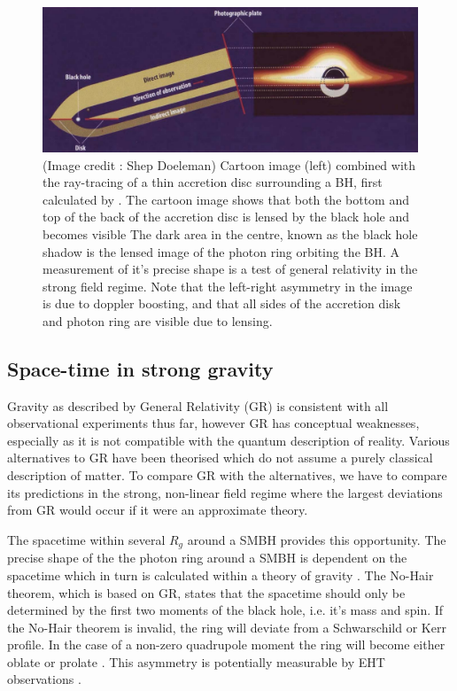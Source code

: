 \begin{figure}
\begin{center}
\includegraphics[width=\columnwidth]{Images/lensed_cartoon}
\caption{(Image credit : Shep Doeleman) Cartoon image (left) combined with the ray-tracing of a thin accretion disc surrounding a BH, first calculated by \citet{Luminet_1979}. The cartoon image shows that both the bottom and top of the back of the accretion disc is lensed by the black hole and becomes visible The dark area in the centre, known as the black hole shadow is the lensed image of the photon ring orbiting the BH. A measurement of it's precise shape is a test of general relativity in the strong field regime. Note that the left-right asymmetry in the image is due to doppler boosting, and that all sides of the accretion disk and photon ring are visible due to lensing. \label{fig:grmhd}%
}
\end{center}

\end{figure}



\subsection{Space-time in strong gravity}

Gravity as described by General Relativity (GR) is consistent with all observational experiments thus far, however GR has conceptual weaknesses, especially as it is not compatible with the quantum description of reality. Various alternatives to GR have been theorised which do not assume a purely classical description of matter. To compare GR with the alternatives, we have to compare its predictions in the strong, non-linear field regime where the largest deviations from GR would occur if it were an approximate theory.


The spacetime within several $R_g$ around a SMBH provides this opportunity. The precise shape of the the photon ring around a SMBH is dependent on the spacetime which in turn is calculated within a theory of gravity \citep{Takahashi_2004}. The No-Hair theorem, which is based on GR, states that the spacetime should only be determined by the first two moments of the black hole, i.e. it's mass and spin. If the No-Hair theorem is invalid, the ring will deviate from a Schwarschild or Kerr profile. In the case of a non-zero quadrupole moment the ring will become either oblate or prolate \citep{Johannsen_2010}. This asymmetry is potentially measurable by EHT observations \citep{Broderick_2014}.

